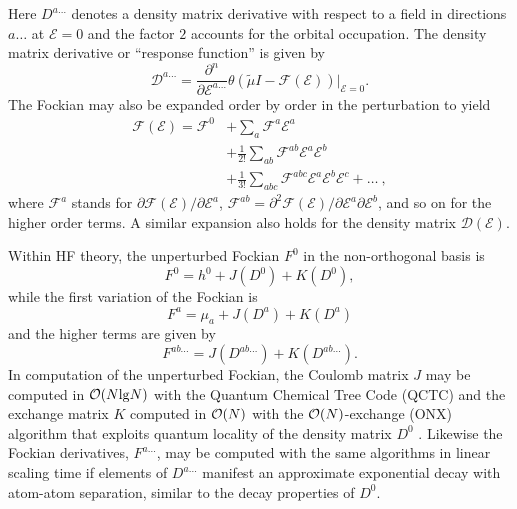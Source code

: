 \documentclass[prl,aps,preprint,showpacs,superbib]{revtex4}
\def\F{\mathcal{F}}
\def\D{\mathcal{D}}
\def\E{\mathcal{E}}
\begin{document}
Here $D^{a\ldots}$ denotes a density matrix derivative with respect to a field in directions $a\ldots$ 
at $\mathcal{E} = 0$ and the factor $2$ accounts for the orbital occupation. 
The  density matrix derivative or ``response function'' is given by 
\begin{equation}
 \displaystyle\D^{a\ldots}=
 \frac{\partial^n}{\partial\E^{a\ldots}}\theta(\tilde{\mu}I-
 \F(\E))\bigg|_{\E=0} \label{DDeriv1}.
\end{equation}
 The Fockian may also be expanded order by order in the perturbation to yield
\begin{equation}\label{FockianTaylor}
  \begin{split}
    \F(\E)=\F^{0} & +\sum_a \F^{a}\E^{a}\\
    &+\frac{1}{2!}\sum_{ab} \F^{ab}\E^{a}\E^{b}\\
    &+\frac{1}{3!}\sum_{abc} \F^{abc}\E^{a}\E^{b}\E^{c}+\dots ~,
  \end{split}
\end{equation}
where $\F^{a}$ stands for $\partial\F(\E)/\partial\E^{a}$,
$\F^{ab}=\partial^2\F(\E)/\partial\E^{a}\partial\E^{b}$,
and so on for the higher order terms.
A similar expansion also holds for the density matrix $\D(\E)$.

Within HF theory, the unperturbed Fockian $F^0$ in the non-orthogonal basis is 
\begin{equation}
F^0=h^0+J(D^0)+K(D^0), \label{fockian0}
\end{equation}
while the first variation of the Fockian is 
\begin{equation}
F^a=\mu_a+J(D^a)+K(D^a)
\end{equation}
and the higher terms are given by 
\begin{equation}
F^{ab\ldots}=J(D^{ab\ldots})+K(D^{ab\ldots}). \label{fockianN}
\end{equation}
In computation of the unperturbed Fockian, the Coulomb matrix $J$ may be computed in ${\cal O}(N{\rm lg}N)$ 
with the Quantum Chemical Tree Code (QCTC) \cite{MChallacombe97} and the
exchange matrix $K$ computed in ${\cal O}(N)$ with the ${\cal O}(N)$-exchange  (ONX) algorithm 
that exploits quantum locality of the density matrix $D^0$ \cite{ESchwegler97}.
Likewise the Fockian derivatives, $F^{a\ldots}$, may be computed 
with the same algorithms in linear scaling time if elements of 
$D^{a\ldots}$ manifest an approximate exponential decay with atom-atom separation, 
similar to the decay properties of $D^0$. 
\end{document}
